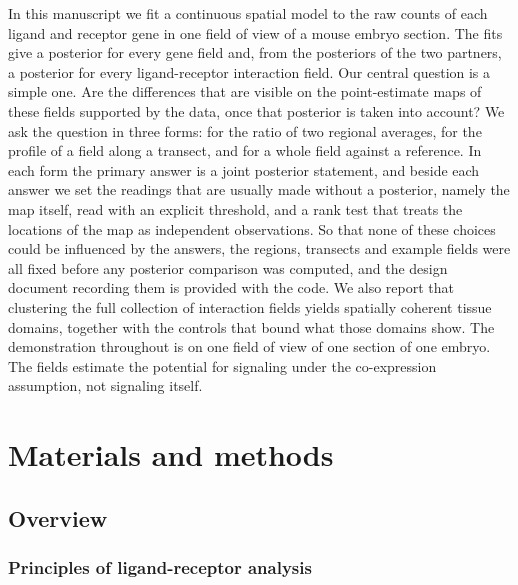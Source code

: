 \documentclass[10pt,letterpaper]{article}
\begin{document}
In this manuscript we fit a continuous spatial model to the raw counts of each ligand and receptor gene in one field of view of a mouse embryo section. The fits give a posterior for every gene field and, from the posteriors of the two partners, a posterior for every ligand-receptor interaction field. Our central question is a simple one. Are the differences that are visible on the point-estimate maps of these fields supported by the data, once that posterior is taken into account? We ask the question in three forms: for the ratio of two regional averages, for the profile of a field along a transect, and for a whole field against a reference. In each form the primary answer is a joint posterior statement, and beside each answer we set the readings that are usually made without a posterior, namely the map itself, read with an explicit threshold, and a rank test that treats the locations of the map as independent observations. So that none of these choices could be influenced by the answers, the regions, transects and example fields were all fixed before any posterior comparison was computed, and the design document recording them is provided with the code. We also report that clustering the full collection of interaction fields yields spatially coherent tissue domains, together with the controls that bound what those domains show. The demonstration throughout is on one field of view of one section of one embryo. The fields estimate the potential for signaling under the co-expression assumption, not signaling itself.

\section*{Materials and methods}\label{sec:materials}

\subsection*{Overview}

\subsubsection*{Principles of ligand-receptor analysis}
\end{document}
